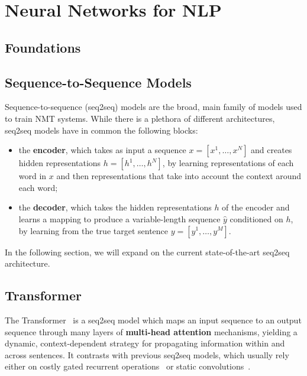 \section{Neural Networks for NLP}
\label{sec:nmt}

\subsection{Foundations}

\subsection{Sequence-to-Sequence Models}
\label{sec:transformer_bg}

Sequence-to-sequence (seq2seq) models are the broad, main family of models
used to train NMT systems. While there is a plethora of different architectures,
seq2seq models have in common the following blocks:

\begin{itemize}
    \item the {\bf encoder}, which takes as input a sequence $x=[x^1,
              \dots, x^N]$ and creates hidden representations $h=[h^1, \dots,
              h^N]$, by learning representations of each word in $x$ and then
          representations that take into account the context around each word;
    \item the {\bf decoder}, which takes the hidden representations
          $h$ of the encoder and learns a mapping to produce a
          variable-length sequence $\hat{y}$ conditioned on $h$, by
          learning from the true target sentence $y=[y^1, \dots, y^M]$.
\end{itemize}

In the following section, we will expand on the current
state-of-the-art seq2seq architecture.

\subsection{Transformer}

The Transformer~\citep{vaswani2017attention} is a
seq2seq model which maps an input sequence to
an output sequence through many layers of \textbf{multi-head
    attention} mechanisms, yielding a dynamic, context-dependent strategy
for propagating information within and across sentences. It contrasts
with previous seq2seq models, which usually rely either on costly
gated recurrent operations~\citep[often
    LSTMs:][]{bahdanau2014neural,luong2015effective} or static
convolutions~\citep{convseq}.

